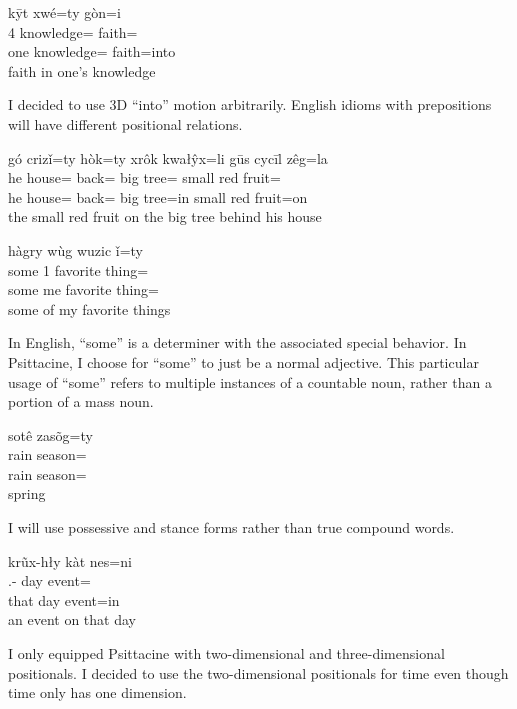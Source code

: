 \begin{exe}
    \ex
    \glll
    kȳt xwé=ty gòn=i \\
    4\Sg{} knowledge=\Poss{} faith=\IllThree{} \\
    one knowledge=\Poss{} faith=into \\
    \glt
    faith in one's knowledge
\end{exe}
I decided to use 3D ``into'' motion arbitrarily.
English idioms with prepositions
will have different positional relations.

\begin{exe}
    \ex
    \glll
    gó crizǐ=ty hòk=ty xrôk kwałŷx=li gūs cycīl zêg=la \\
    he house=\Poss{} back=\Poss{} big tree=\InessThree{} small red fruit=\AdessThree{} \\
    he house=\Poss{} back=\Poss{} big tree=in small red fruit=on \\
    \glt
    the small red fruit on the big tree behind his house
\end{exe}

\begin{exe}
    \ex
    \glll
    hàgry wùg wuzic ǐ=ty \\
    some 1\Sg{} favorite thing=\Poss{} \\
    some me favorite thing=\Poss{} \\
    \glt
    some of my favorite things
\end{exe}
In English, ``some'' is a determiner with the associated special behavior.
In Psittacine, I choose for ``some'' to just be a normal adjective.
This particular usage of ``some'' refers to multiple instances of a countable noun,
rather than a portion of a mass noun.

\begin{exe}
    \ex
    \glll
    sotê zasõg=ty \\
    rain season=\Poss{} \\
    rain season=\Poss{} \\
    \glt
    spring
\end{exe}
I will use possessive and stance forms
rather than true compound words.

\begin{exe}
    \ex
    \glll
    krũx-hły kàt nes=ni \\
    \Dem{}.\Dist{}-\Adj{} day event=\InessTwo{} \\
    that day event=in \\
    \glt
    an event on that day
\end{exe}
I only equipped Psittacine with
two-dimensional and three-dimensional positionals.
I decided to use the two-dimensional positionals
for time even though time only has one dimension.

